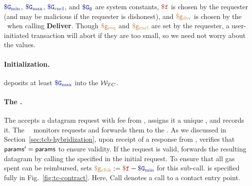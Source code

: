 $\constgasmin$, $\constgasmax$, $\constgasinvokecancel$, and $\constgascancel$ are system constants,
$\fee$ is chosen by the requester (and may be malicious if the requester is dishonest),
and $\textcolor{brown}{\tt \$g_\text{dvr}}$ is chosen by the \tc\ \encname when calling {\bf Deliver}.
Though $\textcolor{brown}{\tt \$g_\text{req}}$ and $\textcolor{brown}{\tt \$g_\text{cncl}}$ are set by the requester, a user-initiated transaction will abort if they are too small, so we need not worry about the values.

\paragraph{Initialization.}
\tc deposits at least $\constgasmax$ into the $\tcadd$.

\paragraph{The \tcontract \tcont.}
The \tcontract accepts a datagram request with fee \fee from \reqcont, assigns it a unique \dgid, and records it.
The \tcs\ \medname\ \relay monitors requests and forwards them to the \encname.
As we discussed in Section~\ref{sec:tcb-hybridization}, upon receipt of a response from \tcadd, \tcont verifies that ${\sf params}' = {\sf params}$ to ensure validity.
If the request is valid, \tcont forwards the resulting datagram \dgm by calling the \dgcallback specified in the initial request.
To ensure that all gas spent can be reimbursed, \tcont sets $\gascallback := \fee - \constgasmin$ for this sub-call.
\tcont is specified fully in Fig.~\ref{fig:tc-contract}. Here, Call denotes a call to a contact entry point. 

